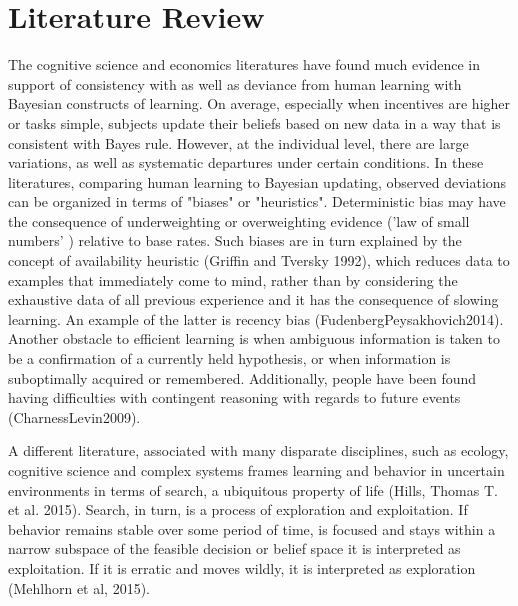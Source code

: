 \section{Literature Review}
The cognitive science and economics literatures have found much evidence in support of consistency with as well as deviance from human learning with Bayesian constructs of learning. On average, especially when incentives are higher or tasks simple, subjects update their beliefs based on new data in a way that is consistent with Bayes rule. However, at the individual level, there are large variations, as well as systematic departures under certain conditions.  In these literatures, comparing human learning to Bayesian updating, observed deviations can be organized in terms of "biases" or "heuristics".  Deterministic bias may have the consequence of underweighting or overweighting evidence ('law of small numbers' ) relative to base rates.  Such biases are in turn explained by the concept of availability heuristic (Griffin and Tversky 1992), which reduces data to examples that immediately come to mind, rather than by considering the exhaustive data of all previous experience and it has the consequence of slowing learning.  An example of the latter is recency bias (FudenbergPeysakhovich2014).  Another obstacle to efficient learning is when ambiguous information is taken to be a confirmation of a currently held hypothesis, or when information is suboptimally acquired or remembered.  Additionally, people have been found having difficulties with contingent reasoning with regards to future events (CharnessLevin2009). 
 
A different literature, associated with many disparate disciplines, such as ecology, cognitive science and complex systems frames learning and behavior in uncertain environments in terms of search, a ubiquitous property of life (Hills, Thomas T. et al. 2015).  Search, in turn, is a process of exploration and exploitation.  If behavior remains stable over some period of time, is focused and stays within a narrow subspace of the feasible decision or belief space it is interpreted as exploitation.  If it is erratic and moves wildly, it is interpreted as exploration (Mehlhorn et al, 2015).   


